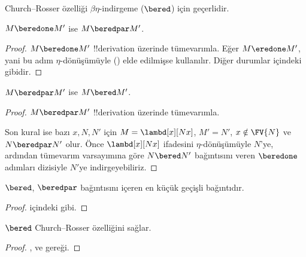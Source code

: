 



Church--Rosser özelliği $\beta\eta$-indirgeme ($\bered$) için geçerlidir.

\begin{lem}
  $M \beredone M'$ ise $M \beredpar M'$.
\end{lem}

\begin{proof}
  $M \beredone M'$ !!{derivation} üzerinde tümevarımla. Eğer
  $M \eredone M'$, yani bu adım $\eta$-dönüşümüyle
  () elde edilmişse
   kullanılır. Diğer durumlar
   içindeki gibidir.
\end{proof}


\begin{lem}
  $M \beredpar M'$ ise $M \bered M'$.
\end{lem}

\begin{proof} $M \beredpar M'$ !!{derivation} üzerinde tümevarımla.

  Son kural  ise bazı $x,N,N'$ için
  $M=\lambd[x][Nx]$, $M'=N'$, $x\notin\FV{N}$ ve $N\beredpar N'$ olur.
  Önce $\lambd[x][Nx]$ ifadesini $\eta$-dönüşümüyle $N$'ye, ardından
  tümevarım varsayımına göre $N\bered N'$ bağıntısını veren $\beredone$
  adımları dizisiyle $N'$ye indirgeyebiliriz.
\end{proof}


\begin{lem}
  $\bered$, $\beredpar$ bağıntısını içeren en küçük geçişli bağıntıdır.
\end{lem}

\begin{proof}
   içindeki gibi.
\end{proof}

\begin{thm}
  $\bered$ Church--Rosser özelliğini sağlar.
\end{thm}

\begin{proof}
  ,  ve  gereği.
\end{proof}

